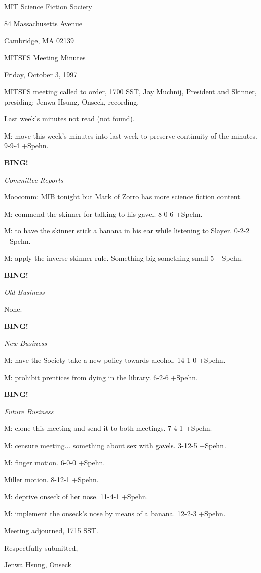 \documentclass[12pt]{article}
\newcommand{\bing}{{\bf BING!} }
\newcommand{\goto}[1]{\bing \vskip 12pt \centerline{{\em{#1}}}}
\begin{document}
\begin{center}

MIT Science Fiction Society 

84 Massachusetts Avenue

Cambridge, MA 02139

\vspace{12pt}

MITSFS Meeting Minutes 

Friday, October 3, 1997

\end{center}
 
\vspace{18pt}

\setlength{\parskip}{6pt}

\noindent
MITSFS meeting called to order, 1700 SST,
Jay Muchnij, President and Skinner, presiding; Jenwa Hsung, Onseck, recording.

Last week's minutes not read (not found).

M: move this week's minutes into last week to preserve continuity of the minutes. 9-9-4 +Spehn.

\goto{Committee Reports}

Moocomm: MIB tonight but Mark of Zorro has more science fiction content.

M: commend the skinner for talking to his gavel. 8-0-6 +Spehn.

M: to have the skinner stick a banana in his ear while listening to Slayer. 0-2-2 +Spehn.

M: apply the inverse skinner rule. Something big-something small-5 +Spehn.

\goto{Old Business}

None.

\goto{New Business}

M: have the Society take a new policy towards alcohol. 14-1-0 +Spehn.

M: prohibit prentices from dying in the library. 6-2-6 +Spehn.

\goto{Future Business}

M: clone this meeting and send it to both meetings. 7-4-1 +Spehn.

M: censure meeting... something about sex with gavels. 3-12-5 +Spehn.

M: finger motion. 6-0-0 +Spehn.

Miller motion. 8-12-1 +Spehn.

M: deprive onseck of her nose. 11-4-1 +Spehn.

M: implement the onseck's nose by means of a banana. 12-2-3 +Spehn.

\vspace{12pt}

\noindent
Meeting adjourned, 1715 SST.

\vspace{18pt}

\centerline{Respectfully submitted,}
\centerline{Jenwa Hsung, Onseck}
\end{document}
